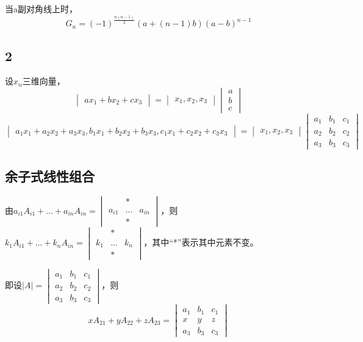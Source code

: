 当a副对角线上时，
\[
G_n = (-1)^{\frac{n(n - 1)}{2}}(a + (n - 1)b)(a - b)^{n - 1}
\]


\subsection{2}

设\(x_n\)三维向量，
\[
\begin{vmatrix}
a x_1 + b x_2 + c x_3
\end{vmatrix} = 
\begin{vmatrix}
x_1, x_2, x_3
\end{vmatrix}
\begin{vmatrix}
a \\ 
b \\ 
c
\end{vmatrix}
\]
\[
\begin{vmatrix}
a_1 x_1 + a_2 x_2 + a_3 x_3, b_1 x_1 + b_2 x_2 + b_3 x_3, c_1 x_1 + c_2 x_2 + c_3 x_3
\end{vmatrix} = 
\begin{vmatrix}
x_1, x_2, x_3
\end{vmatrix}
\begin{vmatrix}
a_1 & b_1 & c_1 \\ 
a_2 & b_2 & c_2 \\ 
a_3 & b_3 & c_3
\end{vmatrix}
\]


\subsection{余子式线性组合}

由\(a_{i1}A_{i1} + ... + a_{in}A_{in} = \begin{vmatrix}
     & * & \\ 
    a_{i1} & ... & a_{in} \\ 
     & * & 
\end{vmatrix}\)，则\(k_{1}A_{i1} + ... + k_{n}A_{in} = 
\begin{vmatrix}
     & * & \\ 
    k_{1} & ... & k_{n} \\ 
     & * & 
\end{vmatrix}\)，其中“*”表示其中元素不变。

即设\(|A| = \begin{vmatrix}
    a_1 & b_1 & c_1 \\ 
    a_2 & b_2 & c_2 \\ 
    a_3 & b_3 & c_3
\end{vmatrix}\)，则\[xA_{21} + yA_{22} + zA_{23} = \begin{vmatrix}
    a_1 & b_1 & c_1 \\ 
    x & y & z \\ 
    a_3 & b_3 & c_3
\end{vmatrix}\]


